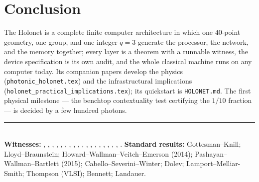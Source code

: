 \documentclass[11pt]{article}
\begin{document}
\section{Conclusion}
The Holonet is a complete finite computer architecture in which one $40$-point geometry, one group, and
one integer $q=3$ generate the processor, the network, and the memory together; every layer is a theorem
with a runnable witness, the device specification is its own audit, and the whole classical machine runs
on any computer today. Its companion papers develop the physics (\texttt{photonic\_holonet.tex}) and the
infrastructural implications (\texttt{holonet\_practical\_implications.tex}); its quickstart is
\texttt{HOLONET.md}. The first physical milestone --- the benchtop contextuality test certifying the
$1/10$ fraction --- is decided by a few hundred photons.

\medskip
\noindent\rule{\linewidth}{0.4pt}\\[0.2em]
{\footnotesize \textbf{Witnesses:} , ,
, , ,
, , ,
, , ,
, , ,
, ,
, ,
. \textbf{Standard results:}
Gottesman--Knill; Lloyd--Braunstein; Howard--Wallman--Veitch--Emerson (2014); Pashayan--Wallman--Bartlett
(2015); Cabello--Severini--Winter; Dolev; Lamport--Melliar-Smith; Thompson (VLSI); Bennett; Landauer.}
\end{document}
